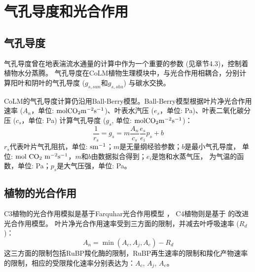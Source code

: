 \chapter{气孔导度和光合作用}


\section{气孔导度}\label{气孔导度}
气孔导度曾在地表湍流水通量的计算中作为一个重要的参数 (见章节4.3)，控制着植物水分蒸腾。
气孔导度在CoLM植物生理模块中，与光合作用相耦合，分别计算阳叶和阴叶的气孔导度 ($g_{s,sun}$和$g_{s,sha}$) 与碳水交换。


CoLM的气孔导度计算仍沿用Ball-Berry模型。Ball-Berry模型根据叶片净光合作用速率 
($A_n$，单位: $\rm mol CO_2 m^{-2}s^{-1}$)、叶表水汽压 ($e_s$，单位: Pa)、叶表二氧化碳分压 ($c_s$，单位: Pa) 
计算气孔导度 ($g_s$, 单位: $\rm mol CO_2 m^{-2}s^{-1}$)： 
\begin{equation}\label{rs_a1}
\frac{1}{r_{s}}=g_{s}=m \frac{A_{n}}{c_{s}} \frac{e_{s}}{e_{i}} p_{s}+b
\end{equation}
$r_s$代表叶片气孔阻抗，单位: $\rm s m^{-1}$；$m$是无量纲经验参数；$b$是最小气孔导度，
单位: $\rm mol\ CO_2\ m^{-2}s^{-1}$，$m$和$b$由数据拟合得到；$e_i$是饱和水蒸气压，
为气温的函数，单位: Pa；$p_s$是大气压强，单位: Pa。
\section{植物的光合作用}\label{植物的光合作用}
C3植物的光合作用模拟是基于Farquhar光合作用模型 \citep{farquhar1980biochemical} ，
C4植物则是基于\citet{collatz1992} 的改进光合作用模型。
叶片净光合作用速率受到三方面的限制，并减去叶呼吸速率 ($R_d$)：
\begin{equation}\label{An1}
A_{n}=\min \left(A_{c}, A_{j}, A_{e}\right)-R_{d}
\end{equation}
这三方面的限制包括RuBP羧化酶的限制，RuBP再生速率的限制和羧化产物速率的限制，相应的受限羧化速率分别表达为：$A_{c}$, $A_{j}$, $A_{e}$。


